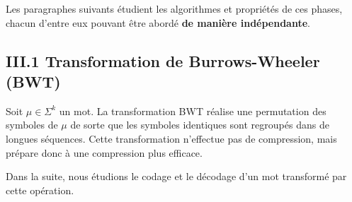 \documentclass[11pt,a4paper]{article}\nofiles
\begin{document}
Les paragraphes suivants \'etudient les algorithmes et propri\'et\'es de ces phases, chacun d'entre eux pouvant \^etre abord\'e \textbf{de mani\`ere ind\'ependante}.

\subsection*{III.1 Transformation de Burrows-Wheeler (BWT)}
Soit $\mu\in \Sigma^k$ un mot. La transformation BWT r\'ealise une permutation des symboles de $\mu$ de sorte que les symboles identiques sont regroup\'es dans de longues s\'equences. 
Cette transformation n'effectue pas de compression, mais pr\'epare donc \`a une compression plus efficace.

Dans la suite, nous \'etudions le codage et le d\'ecodage d'un mot transform\'e par cette op\'eration.\\
\end{document}
